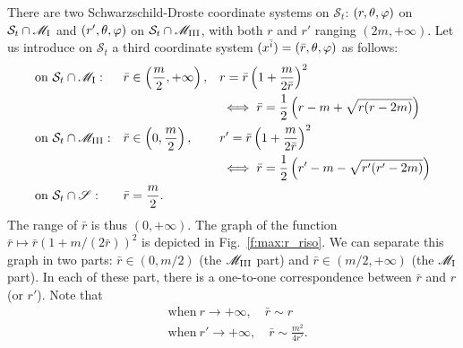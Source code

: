There are two Schwarzschild-Droste coordinate systems on $\mathcal{S}_t$:
$(r,\theta,\varphi)$ on $\mathcal{S}_t\cap \mathscr{M}_{\rm I}$ and $(r',\theta,\varphi)$ on
$\mathcal{S}_t\cap \mathscr{M}_{\rm III}$, with both $r$ and $r'$ ranging
$(2m,+\infty)$.
Let us introduce on $\mathcal{S}_t$ a third coordinate system $(x^{\bar{i}})=(\bar{r},\theta,\varphi)$
as follows:
\begin{subequations}
\begin{align}
& \mbox{on}\ \mathcal{S}_t\cap \mathscr{M}_{\rm I}:  & & \bar{r} \in \left(\frac{m}{2}, +\infty \right), & &
     r = \bar{r} \left( 1 + \frac{m}{2\bar{r}} \right)^2 \label{e:max:r_riso}\\
& & & & & \iff \bar{r} = \frac{1}{2} \left( r - m + \sqrt{r (r-2m)} \right) \\
&\mbox{on}\ \mathcal{S}_t\cap  \mathscr{M}_{\rm III}:& &
    \bar{r} \in \left(0, \frac{m}{2} \right), & &
    r' = \bar{r} \left( 1 + \frac{m}{2\bar{r}} \right)^2 \label{e:max:rp_riso} \\
& & & & & \iff \bar{r} = \frac{1}{2} \left( r' - m - \sqrt{r' (r'-2m)} \right) \\
&\mbox{on}\ \mathcal{S}_t\cap \mathscr{S} : & & \bar{r} = \frac{m}{2} .& &
\end{align}
\end{subequations}
The range of $\bar{r}$ is thus $(0,+\infty)$.
The graph of the function
$\bar{r} \mapsto \bar{r}(1+m/(2\bar{r}))^2$ is depicted in
Fig.~\ref{f:max:r_riso}. We can separate this graph in two parts:
$\bar{r}\in (0,m/2)$ (the $\mathscr{M}_{\rm III}$ part) and $\bar{r}\in (m/2, +\infty)$
(the $\mathscr{M}_{\rm I}$ part). In each of these part, there is a one-to-one
correspondence between $\bar{r}$ and $r$ (or $r'$). Note that
\begin{subequations}
\begin{align}
    & \mbox{when}\ r\rightarrow +\infty,\quad \bar{r} \sim r \\
    & \mbox{when}\ r'\rightarrow +\infty,\quad \bar{r} \sim \frac{m^2}{4 r'} .
\end{align}
\end{subequations}

